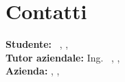\section*{Contatti}
\textbf{Studente:} \nomeStudente\ \cognomeStudente, \href{mailto:\emailStudente}{\emailStudente}, \telStudente \\
\textbf{Tutor aziendale:} Ing. \nomeTutorAziendale\ \cognomeTutorAziendale, \href{mailto:\emailTutorAziendale}{\emailTutorAziendale}, \telTutorAziendale \\
\textbf{Azienda:} \ragioneSocAzienda, \indirizzoAzienda, \href{\sitoAzienda}{\sitoAzienda}
